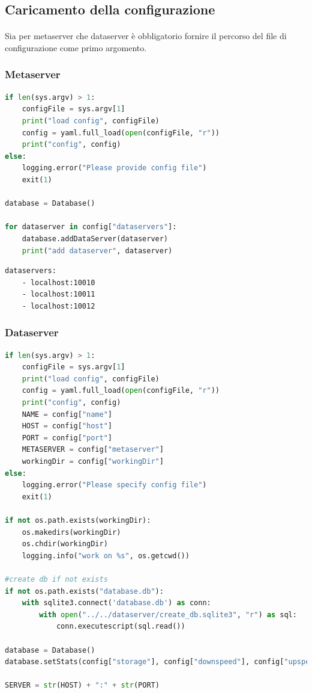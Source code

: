\documentclass[11pt,a4paper,english]{article}
\begin{document}
\subsection{Caricamento della configurazione}

\paragraph{} Sia per metaserver che dataserver è obbligatorio fornire il percorso del file di configurazione come primo argomento. 

\subsubsection{Metaserver}

\begin{lstlisting}[language=Python, title=Codice]
if len(sys.argv) > 1:
	configFile = sys.argv[1]
	print("load config", configFile)
	config = yaml.full_load(open(configFile, "r"))
	print("config", config)
else:
	logging.error("Please provide config file")
	exit(1)

database = Database()

for dataserver in config["dataservers"]:
	database.addDataServer(dataserver)
	print("add dataserver", dataserver)
\end{lstlisting}

\begin{lstlisting}[title=Esempio di configurazione]
dataservers:
	- localhost:10010
	- localhost:10011
	- localhost:10012
\end{lstlisting}

\subsubsection{Dataserver}

\begin{lstlisting}[language=Python, title=Codice]
if len(sys.argv) > 1:
	configFile = sys.argv[1]
	print("load config", configFile)
	config = yaml.full_load(open(configFile, "r"))
	print("config", config)
	NAME = config["name"]
	HOST = config["host"]
	PORT = config["port"]
	METASERVER = config["metaserver"]
	workingDir = config["workingDir"]
else:
	logging.error("Please specify config file")
	exit(1)
	
if not os.path.exists(workingDir):
	os.makedirs(workingDir)
	os.chdir(workingDir)
	logging.info("work on %s", os.getcwd())

#create db if not exists
if not os.path.exists("database.db"):
	with sqlite3.connect('database.db') as conn:
		with open("../../dataserver/create_db.sqlite3", "r") as sql:
			conn.executescript(sql.read())

database = Database()
database.setStats(config["storage"], config["downspeed"], config["upspeed"])

SERVER = str(HOST) + ":" + str(PORT)

\end{lstlisting}
\end{document}
